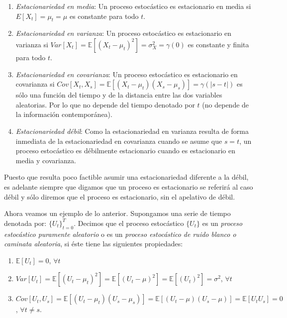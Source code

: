 \documentclass[
  a4paper,
]{article}
\begin{document}
\begin{enumerate}
\def\labelenumi{\arabic{enumi}.}
\item
  \emph{Estacionariedad en media}: Un proceso estocástico es
  estacionario en media si \(E[X_t] = \mu_t = \mu\) es constante para
  todo \(t\).
\item
  \emph{Estacionariedad en varianza}: Un proceso estocástico es
  estacionario en varianza si
  \(Var[X_t] = \mathbb{E}[(X_t - \mu_t)^2] = \sigma^2_X = \gamma(0)\) es
  constante y finita para todo \(t\).
\item
  \emph{Estacionariedad en covarianza}: Un proceso estocástico es
  estacionario en covarianza si
  \(Cov[X_t,X_s] = \mathbb{E}[(X_t - \mu_t)(X_s - \mu_s)] = \gamma(|s-t|)\)
  es sólo una función del tiempo y de la distancia entre las dos
  variables aleatorias. Por lo que no depende del tiempo denotado por
  \(t\) (no depende de la información contemporánea).
\item
  \emph{Estacionariedad débil}: Como la estacionariedad en varianza
  resulta de forma inmediata de la estacionariedad en covarianza cuando
  se asume que \(s = t\), un proceso estocástico es débilmente
  estacionario cuando es estacionario en media y covarianza.
\end{enumerate}

Puesto que resulta poco factible asumir una estacionariedad diferente a
la débil, es adelante siempre que digamos que un proceso es estacionario
se referirá al caso débil y sólo diremos que el proceso es estacionario,
sin el apelativo de débil.

Ahora veamos un ejemplo de lo anterior. Supongamos una serie de tiempo
denotada por: \(\{U_t\}^T_{t = 0}\). Decimos que el proceso estocástico
\(\{U_t\}\) es un \textit{proceso estocástico puramente aleatorio} o es
un \textit{proceso estocástico de ruido blanco o caminata aleatoria}, si
éste tiene las siguientes propiedades:

\begin{enumerate}
\def\labelenumi{\arabic{enumi}.}
\item
  \(\mathbb{E}[U_t] = 0\), \(\forall t\)
\item
  \(Var[U_t] = \mathbb{E}[(U_t - \mu_t)^2] = \mathbb{E}[(U_t - \mu)^2] = \mathbb{E}[(U_t)^2] = \sigma^2\),
  \(\forall t\)
\item
  \(Cov[U_t,U_s] = \mathbb{E}[(U_t - \mu_t)(U_s - \mu_s)] = \mathbb{E}[(U_t - \mu)(U_s - \mu)] = \mathbb{E}[U_t U_s] = 0\),
  \(\forall t \neq s\).
\end{enumerate}
\end{document}
